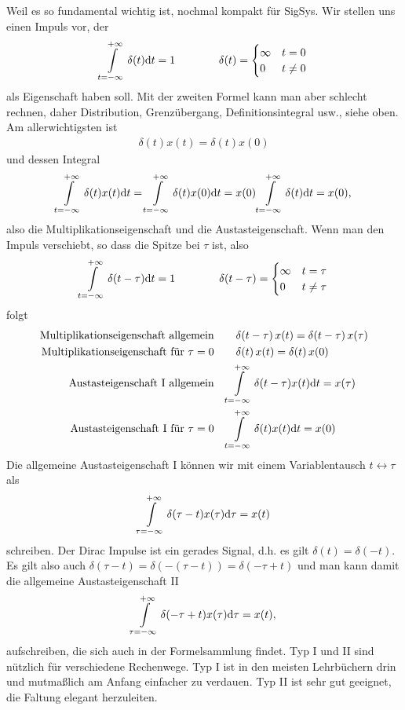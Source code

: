 \noindent Weil es so fundamental wichtig ist, nochmal kompakt für SigSys.
%
Wir stellen uns einen Impuls vor, der
\begin{align}
\int\limits_{t=-\infty}^{+\infty} \delta(t) \mathrm{d} t = 1
\qquad\qquad
\delta(t) =
\begin{cases}
\infty & t=0\\
0  & t \neq 0
\end{cases}
\end{align}
als Eigenschaft haben soll. Mit der zweiten Formel kann man aber schlecht rechnen, daher Distribution, Grenzübergang, Definitionsintegral usw., siehe oben.
Am allerwichtigsten ist
\begin{align}
\delta(t) x(t) = \delta(t) x(0)
\end{align}
und dessen Integral
\begin{align}
\int\limits_{t=-\infty}^{+\infty} \delta(t) x(t) \mathrm{d} t= \int\limits_{t=-\infty}^{+\infty}  \delta(t) x(0) \mathrm{d} t = x(0) \int\limits_{t=-\infty}^{+\infty} \delta(t) \mathrm{d} t = x(0),
\end{align}
also die Multiplikationseigenschaft und die Austasteigenschaft.
Wenn man den Impuls verschiebt, so dass die Spitze bei $\tau$ ist, also
\begin{align}
\int\limits_{t=-\infty}^{+\infty} \delta(t-\tau) \mathrm{d} t = 1
\qquad\qquad
\delta(t-\tau) =
\begin{cases}
\infty & t=\tau\\
0  & t \neq \tau
\end{cases}
\end{align}
folgt
\begin{align}
\text{Multiplikationseigenschaft allgemein} & \qquad\delta(t-\tau)\,x(t) = \delta(t-\tau)\,x(\tau)\\
\text{Multiplikationseigenschaft für } \tau=0 & \qquad\delta(t)\,x(t) = \delta(t)\,x(0)\\
\text{Austasteigenschaft I allgemein} & \quad \int\limits_{t=-\infty}^{+\infty} \delta(t-\tau) x(t)\mathrm{d} t = x(\tau)\\
\text{Austasteigenschaft I für } \tau=0& \quad \int\limits_{t=-\infty}^{+\infty} \delta(t) x(t)\mathrm{d} t = x(0)
\end{align}
%
Die allgemeine Austasteigenschaft I können wir mit einem Variablentausch $t \leftrightarrow \tau$ als
\begin{align}
\int\limits_{\tau=-\infty}^{+\infty} \delta(\tau-t) x(\tau)\mathrm{d} \tau = x(t)
\end{align}
schreiben. Der Dirac Impulse ist ein gerades Signal, d.h. es gilt $\delta(t)=\delta(-t)$. Es gilt also auch $\delta(\tau-t)=\delta(-(\tau-t))=\delta(-\tau+t)$ und man kann damit die allgemeine Austasteigenschaft II
\begin{align}
\int\limits_{\tau=-\infty}^{+\infty} \delta(-\tau+t) x(\tau)\mathrm{d} \tau = x(t),
\end{align}
aufschreiben, die sich auch in der Formelsammlung findet. Typ I und II sind nützlich für verschiedene Rechenwege. Typ I ist in den meisten Lehrbüchern drin und mutmaßlich am Anfang einfacher zu verdauen. Typ II ist sehr gut geeignet, die Faltung elegant herzuleiten.


